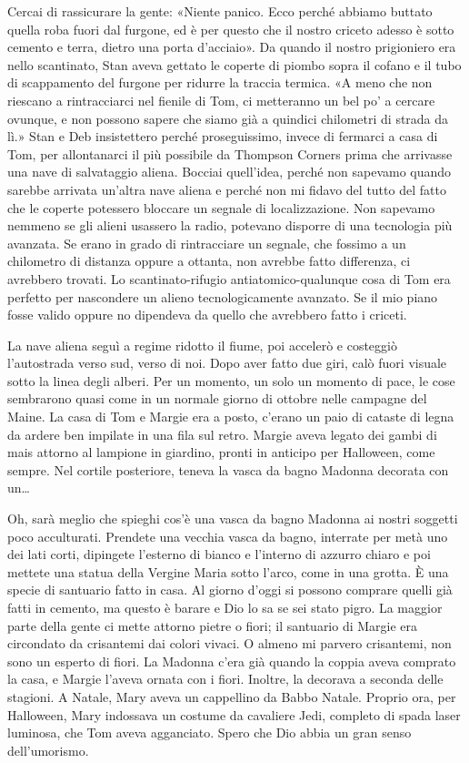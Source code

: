 Cercai di rassicurare la gente: «Niente panico. Ecco perché abbiamo
buttato quella roba fuori dal furgone, ed è per questo che il nostro
criceto adesso è sotto cemento e terra, dietro una porta d'acciaio». Da
quando il nostro prigioniero era nello scantinato, Stan aveva gettato le
coperte di piombo sopra il cofano e il tubo di scappamento del furgone
per ridurre la traccia termica. «A meno che non riescano a rintracciarci
nel fienile di Tom, ci metteranno un bel po' a cercare ovunque, e non
possono sapere che siamo già a quindici chilometri di strada da lì.»
Stan e Deb insistettero perché proseguissimo, invece di fermarci a casa
di Tom, per allontanarci il più possibile da Thompson Corners prima che
arrivasse una nave di salvataggio aliena. Bocciai quell'idea, perché non
sapevamo quando sarebbe arrivata un'altra nave aliena e perché non mi
fidavo del tutto del fatto che le coperte potessero bloccare un segnale
di localizzazione. Non sapevamo nemmeno se gli alieni usassero la radio,
potevano disporre di una tecnologia più avanzata. Se erano in grado di
rintracciare un segnale, che fossimo a un chilometro di distanza oppure
a ottanta, non avrebbe fatto differenza, ci avrebbero trovati. Lo
scantinato-rifugio antiatomico-qualunque cosa di Tom era perfetto per
nascondere un alieno tecnologicamente avanzato. Se il mio piano fosse
valido oppure no dipendeva da quello che avrebbero fatto i criceti.

La nave aliena seguì a regime ridotto il fiume, poi accelerò e costeggiò
l'autostrada verso sud, verso di noi. Dopo aver fatto due giri, calò
fuori visuale sotto la linea degli alberi. Per un momento, un solo un
momento di pace, le cose sembrarono quasi come in un normale giorno di
ottobre nelle campagne del Maine. La casa di Tom e Margie era a posto,
c'erano un paio di cataste di legna da ardere ben impilate in una fila
sul retro. Margie aveva legato dei gambi di mais attorno al lampione in
giardino, pronti in anticipo per Halloween, come sempre. Nel cortile
posteriore, teneva la vasca da bagno Madonna decorata con un\ldots{}

Oh, sarà meglio che spieghi cos'è una vasca da bagno Madonna ai nostri
soggetti poco acculturati. Prendete una vecchia vasca da bagno,
interrate per metà uno dei lati corti, dipingete l'esterno di bianco e
l'interno di azzurro chiaro e poi mettete una statua della Vergine Maria
sotto l'arco, come in una grotta. È una specie di santuario fatto in
casa. Al giorno d'oggi si possono comprare quelli già fatti in cemento,
ma questo è barare e Dio lo sa se sei stato pigro. La maggior parte
della gente ci mette attorno pietre o fiori; il santuario di Margie era
circondato da crisantemi dai colori vivaci. O almeno mi parvero
crisantemi, non sono un esperto di fiori. La Madonna c'era già quando la
coppia aveva comprato la casa, e Margie l'aveva ornata con i fiori.
Inoltre, la decorava a seconda delle stagioni. A Natale, Mary aveva un
cappellino da Babbo Natale. Proprio ora, per Halloween, Mary indossava
un costume da cavaliere Jedi, completo di spada laser luminosa, che Tom
aveva agganciato. Spero che Dio abbia un gran senso dell'umorismo.

